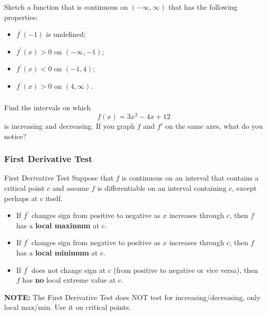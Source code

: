 \documentclass[cal1spr16Lectures.tex]{subfiles}
\begin{document}
\begin{frame}%
\frametitle{}
\begin{ex} Sketch a function that is continuous on $(-\infty,\infty)$ that has the following properties:

\begin{itemize}
\item $f^{\prime}(-1)$ is undefined;

\vspace{1pc}
\item $f^{\prime}(x)>0$ on $(-\infty,-1)$;

\vspace{1pc}
\item $f^{\prime}(x)<0$ on $(-1,4)$;

\vspace{1pc}
\item $f^{\prime}(x)>0$ on $(4,\infty)$.
\end{itemize}
\end{ex}
\end{frame}

\begin{frame}%
\frametitle{}
\begin{ex} Find the intervals on which
$$f(x)=3x^3-4x+12$$
is increasing and decreasing.  If you graph $f$ and $f'$ on the same axes, what do you notice?
\end{ex}
\end{frame}

\subsubsection{First Derivative Test}

\begin{frame}{\small First Derivative Test}
\footnotesize
Suppose that $f$ is continuous on an interval that contains a critical point $c$ and assume $f$ is differentiable on an interval containing $c$, except perhaps at $c$ itself.

\begin{itemize}
\item If $f^{\prime}$ \alert{changes sign} from positive to negative as $x$ increases through $c$, then $f$ has a {\bf local maximum} at $c$.

\vspace{0.5pc}
\item If $f^{\prime}$ \alert{changes sign} from negative to positive as $x$ increases through $c$, then $f$ has a {\bf local minimum} at $c$.

\vspace{0.5pc}
\item If $f^{\prime}$ does not change sign at $c$ (from positive to negative or vice versa), then $f$ has {\bf no} local extreme value at $c$.
\end{itemize}

\alert{{\bf NOTE:} The First Derivative Test does NOT test for increasing/decreasing, only local max/min.}  Use it on critical points. 
\end{frame}
\end{document}
